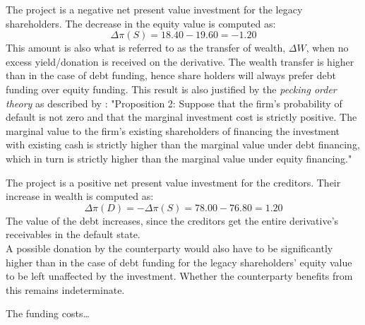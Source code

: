 \documentclass[../main.tex]{subfiles}
\begin{document}
        The project is a negative net present value investment for the legacy shareholders. The decrease in the equity value is computed as:
        \begin{equation}
            \Delta \pi(S) = 18.40 - 19.60 = -1.20
        \end{equation}
        This amount is also what is referred to as the transfer of wealth, $\Delta W$, when no excess yield/donation is received on the derivative. The wealth transfer is higher than in the case of debt funding, hence share holders will always prefer debt funding over equity funding. This result is also justified by the \textit{pecking order theory} as described by \cite{ADS2016}: "Proposition 2: Suppose that the firm's probability of default is not zero and that the marginal investment cost is strictly positive. The marginal value to the firm's existing shareholders of financing the investment with existing cash is strictly higher than the marginal value under debt financing, which in turn is strictly higher than the marginal value under equity financing."

        The project is a positive net present value investment for the creditors. Their increase in wealth is computed as:
        \begin{equation}
            \Delta \pi(D) = -\Delta \pi(S) = 78.00 - 76.80 = 1.20
        \end{equation}
        The value of the debt increases, since the creditors get the entire derivative's receivables in the default state.\\
        A possible donation by the counterparty would also have to be significantly higher than in the case of debt funding for the legacy shareholders' equity value to be left unaffected by the investment. Whether the counterparty benefits from this remains indeterminate. 

        The funding costs\dots
\end{document}
